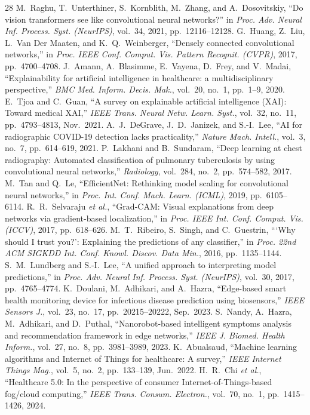 \documentclass[journal]{IEEEtran}
\begin{document}
\begin{thebibliography}{28}
 M.~Raghu, T.~Unterthiner, S.~Kornblith, M.~Zhang, and A.~Dosovitskiy, ``Do vision transformers see like convolutional neural networks?'' in \emph{Proc. Adv. Neural Inf. Process. Syst. (NeurIPS)}, vol.~34, 2021, pp.~12116--12128.
 G.~Huang, Z.~Liu, L.~Van Der Maaten, and K.~Q.~Weinberger, ``Densely connected convolutional networks,'' in \emph{Proc. IEEE Conf. Comput. Vis. Pattern Recognit. (CVPR)}, 2017, pp.~4700--4708.
 J.~Amann, A.~Blasimme, E.~Vayena, D.~Frey, and V.~Madai, ``Explainability for artificial intelligence in healthcare: a multidisciplinary perspective,'' \emph{BMC Med. Inform. Decis. Mak.}, vol.~20, no.~1, pp.~1--9, 2020.
 E.~Tjoa and C.~Guan, ``A survey on explainable artificial intelligence (XAI): Toward medical XAI,'' \emph{IEEE Trans. Neural Netw. Learn. Syst.}, vol.~32, no.~11, pp.~4793--4813, Nov.~2021.
 A.~J.~DeGrave, J.~D.~Janizek, and S.-I.~Lee, ``AI for radiographic COVID-19 detection lacks practicality,'' \emph{Nature Mach. Intell.}, vol.~3, no.~7, pp.~614--619, 2021.
 P.~Lakhani and B.~Sundaram, ``Deep learning at chest radiography: Automated classification of pulmonary tuberculosis by using convolutional neural networks,'' \emph{Radiology}, vol.~284, no.~2, pp.~574--582, 2017.
 M.~Tan and Q.~Le, ``EfficientNet: Rethinking model scaling for convolutional neural networks,'' in \emph{Proc. Int. Conf. Mach. Learn. (ICML)}, 2019, pp.~6105--6114.
 R.~R.~Selvaraju \textit{et al.}, ``Grad-CAM: Visual explanations from deep networks via gradient-based localization,'' in \emph{Proc. IEEE Int. Conf. Comput. Vis. (ICCV)}, 2017, pp.~618--626.
 M.~T.~Ribeiro, S.~Singh, and C.~Guestrin, ```Why should I trust you?': Explaining the predictions of any classifier,'' in \emph{Proc. 22nd ACM SIGKDD Int. Conf. Knowl. Discov. Data Min.}, 2016, pp.~1135--1144.
 S.~M.~Lundberg and S.-I.~Lee, ``A unified approach to interpreting model predictions,'' in \emph{Proc. Adv. Neural Inf. Process. Syst. (NeurIPS)}, vol.~30, 2017, pp.~4765--4774.
 K.~Doulani, M.~Adhikari, and A.~Hazra, ``Edge-based smart health monitoring device for infectious disease prediction using biosensors,'' \emph{IEEE Sensors J.}, vol.~23, no.~17, pp.~20215--20222, Sep.~2023.
 S.~Nandy, A.~Hazra, M.~Adhikari, and D.~Puthal, ``Nanorobot-based intelligent symptoms analysis and recommendation framework in edge networks,'' \emph{IEEE J. Biomed. Health Inform.}, vol.~27, no.~8, pp.~3981--3989, 2023.
 K.~Abualsaud, ``Machine learning algorithms and Internet of Things for healthcare: A survey,'' \emph{IEEE Internet Things Mag.}, vol.~5, no.~2, pp.~133--139, Jun.~2022.
 H.~R.~Chi \textit{et al.}, ``Healthcare 5.0: In the perspective of consumer Internet-of-Things-based fog/cloud computing,'' \emph{IEEE Trans. Consum. Electron.}, vol.~70, no.~1, pp.~1415--1426, 2024.
\end{thebibliography}
\end{document}

